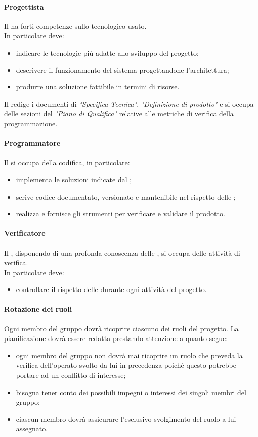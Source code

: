  \paragraph{Progettista}
 Il \PJ{} ha forti competenze sullo  tecnologico usato. \\
 In particolare deve:
 \begin{itemize}
  \item indicare le tecnologie più adatte allo sviluppo del progetto;
  \item descrivere il funzionamento del sistema progettandone l'architettura;
  \item produrre una soluzione fattibile in termini di risorse.
 \end{itemize}
Il \PJ{} redige i documenti di \textit{"Specifica Tecnica"}, \textit{"Definizione di prodotto"} e si occupa delle sezioni del \textit{"Piano di Qualifica"} relative alle metriche di verifica della programmazione.

\paragraph{Programmatore}
 Il \PR{} si occupa della codifica, in particolare:
 \begin{itemize}
  \item implementa le soluzioni indicate dal \PJ ;
  \item scrive codice documentato, versionato e mantenibile nel rispetto delle \NPdoc ;
  \item realizza e fornisce gli strumenti per verificare e validare il prodotto.
 \end{itemize}
 \paragraph{Verificatore}
 Il \VER , disponendo di una profonda conoscenza delle \NPdoc , si occupa delle attività di verifica. \\
 In particolare deve:
 \begin{itemize}
  \item controllare il rispetto delle \NPdoc durante ogni attività del progetto.
 \end{itemize}
 \paragraph{Rotazione dei ruoli}
 Ogni membro del gruppo dovrà ricoprire ciascuno dei ruoli del progetto. La pianificazione dovrà essere redatta prestando attenzione a quanto segue:
 \begin{itemize}
 	\item ogni membro del gruppo non dovrà mai ricoprire un ruolo che preveda la verifica dell'operato svolto da lui in precedenza poiché questo potrebbe portare ad un conflitto di interesse;
 	\item bisogna tener conto dei possibili impegni o interessi dei singoli membri del gruppo;
 	\item ciascun membro dovrà assicurare l'esclusivo svolgimento del ruolo a lui assegnato.
 \end{itemize}

